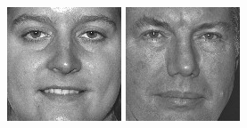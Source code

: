 \begin{figure}[ht]
\begin{center}
  \includegraphics[width=\columnwidth/10]{ch5/figures/feret13.jpg}
  \includegraphics[width=\columnwidth/10]{ch5/figures/feret14.jpg}

\end{center}
\end{figure}
